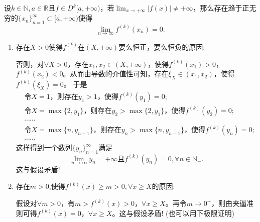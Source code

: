 \documentclass[lang=cn,newtx,10pt,scheme=chinese]{elegantbook}
\begin{document}
\begin{proposition}\label{proposition:函数不爆破则各阶导数必然有趋于 0 的子列}
   设\(k\in\mathbb{N},a\in\mathbb{R}\)且\(f\in D^{k}[a,+\infty)\)，若\(\lim_{x\rightarrow +\infty}|f(x)|\neq +\infty\)，那么存在趋于正无穷的\(\{x_n\}_{n = 1}^{\infty}\subset [a,+\infty)\)使得
\[
\lim_{n\rightarrow\infty}f^{(k)}(x_n)=0.
\]
\end{proposition}
\begin{note}
\begin{enumerate}[(1)]
   \item \hypertarget{proposition5.4由假设得到这个结论的原因}{存在\(X > 0\)使得\(f^{(k)}\)在\((X,+\infty)\)要么恒正，要么恒负的原因:}否则，对\(\forall X>0\)，存在\(x_1,x_2\in (X,+\infty)\)，使得\(f^{(k)}(x_1)>0\)，\(f^{(k)}(x_2)<0\)。从而由导数的介值性可知，存在\(\xi_X\in (x_1,x_2)\)，使得\(f^{(k)}(\xi_X) = 0\)。
   于是
   \begin{align*}
   &\text{令}X = 1\text{，则存在}y_1>1\text{，使得}f^{(k)}(y_1)=0;\\
   &\text{令}X=\max\{2,y_1\}\text{，则存在}y_2>\max\{2,y_1\}\text{，使得}f^{(k)}(y_2)=0;\\
   &\cdots\cdots\\
   &\text{令}X=\max\{n,y_{n - 1}\}\text{，则存在}y_n>\max\{n,y_{n - 1}\}\text{，使得}f^{(k)}(y_n)=0;\\
   &\cdots\cdots
   \end{align*}
   这样得到一个数列\(\{y_n\}_{n = 1}^{\infty}\)满足
   \[
   \lim_{n\rightarrow \infty}y_n=+\infty\text{且}f^{(k)}(y_n)=0,\forall n\in \mathbb{N}_+.
   \]
   这与假设矛盾!

   \item \hypertarget{m的存在性}{存在$m>0$,使得$f^{(k)}(x)\geqslant m>0,\forall x\geqslant X$的原因:}假设对\(\forall m>0\)，有\(m > f^{(k)}(x) > 0\)，\(\forall x\geqslant X\)。再令\(m\rightarrow 0^+\)，则由夹逼准则可得\(f^{(k)}(x) = 0\)，\(\forall x\geqslant X\)。这与假设矛盾!
   (也可以用下极限证明)
\end{enumerate}
\end{note}
\end{document}
